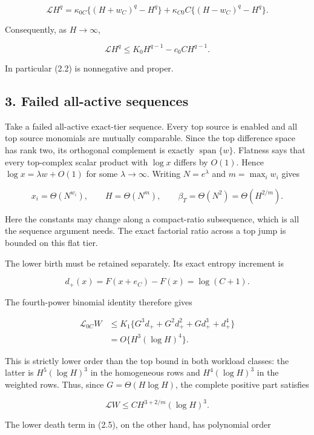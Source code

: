 \[
 \mathcal L H^q
 =\kappa_{0C}\{(H+w_C)^q-H^q\}
  +\kappa_{C0}C\{(H-w_C)^q-H^q\}.                   \tag{2.4}
\]

Consequently, as \(H\to\infty\),

\[
 \mathcal L H^q\le K_0H^{q-1}-c_0CH^{q-1}.          \tag{2.5}
\]

In particular (2.2) is nonnegative and proper.

\subsection{3. Failed all-active
sequences}

Take a failed all-active exact-tier sequence. Every top source is
enabled and all top source monomials are mutually comparable. Since the
top difference space has rank two, its orthogonal complement is exactly
\(\operatorname{span}\{w\}\). Flatness says that every top-complex
scalar product with \(\log x\) differs by \(O(1)\). Hence
\(\log x=\lambda w+O(1)\) for some \(\lambda\to\infty\). Writing
\(N=e^\lambda\) and \(m=\max_i w_i\) gives

\[
 x_i=\Theta(N^{w_i}),\qquad
 H=\Theta(N^m),\qquad
 \beta_T=\Theta(N^2)=\Theta(H^{2/m}).                \tag{3.1}
\]

Here the constants may change along a compact-ratio subsequence, which
is all the sequence argument needs. The exact factorial ratio across a
top jump is bounded on this flat tier.

The lower birth must be retained separately. Its exact entropy increment
is

\[
 d_+(x)=F(x+e_C)-F(x)=\log(C+1).                    \tag{3.2}
\]

The fourth-power binomial identity therefore gives

\[
\begin{split}
 \mathcal L_{0C}W
 &\le K_1\{G^3d_++G^2d_+^2+Gd_+^3+d_+^4\}\\
 &=O\{H^3(\log H)^4\}.
\end{split}\tag{3.3}
\]

This is strictly lower order than the top bound in both workload
classes: the latter is \(H^5(\log H)^3\) in the homogeneous rows and
\(H^4(\log H)^3\) in the weighted rows. Thus, since
\(G=\Theta(H\log H)\), the complete positive part satisfies

\[
 \mathcal LW\le C H^{3+2/m}(\log H)^3.               \tag{3.4}
\]

The lower death term in (2.5), on the other hand, has polynomial order

